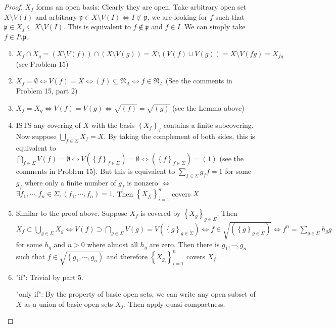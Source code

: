 \documentclass{solution}
\begin{document}
\begin{proof}
    $X_f$ forms an open basis: Clearly they are open. Take arbitrary open set $X \setminus V(I)$ and arbitrary $\mathfrak{p} \in X \setminus V(I) \Leftrightarrow I \not\subset \mathfrak{p}$, we are looking for $f$ such that $\mathfrak{p} \in X_f \subseteq X \setminus V(I)$. This is equivalent to $f \notin \mathfrak{p}$ and $f \in I$. We can simply take $f \in I \setminus \mathfrak{p}$.

    \begin{enumerate}
        \item $X_f \cap X_g = (X \setminus V(f)) \cap (X \setminus V(g)) = X \setminus (V(f) \cup V(g)) = X \setminus V(fg) = X_{fg}$ (see Problem 15)
        \item $X_f = \emptyset \Leftrightarrow V(f) = X \Leftrightarrow (f) \subseteq \mathfrak{N}_A \Leftrightarrow f \in \mathfrak{N}_A$ (See the comments in Problem 15, part 2)
        \item $X_f = X_g \Leftrightarrow V(f) = V(g) \Leftrightarrow \sqrt{(f)} = \sqrt{(g)}$ (see the Lemma above)
        \item ISTS any covering of $X$ with the basis $\left\lbrace X_f \right\rbrace_f$ contains a finite subcovering. Now suppose $\bigcup\limits_{f \in \Sigma} X_f = X$. By taking the complement of both sides, this is equivalent to $\bigcap\limits_{f \in \Sigma} V(f) = \emptyset \Leftrightarrow V(\left\lbrace f \right\rbrace_{f \in \Sigma}) = \emptyset \Leftrightarrow (\left\lbrace f \right\rbrace_{f \in \Sigma}) = (1)$ (see the comments in Problem 15). But this is equivalent to $\sum\limits_{f \in \Sigma} g_ff = 1$ for some $g_f$ where only a finite number of $g_f$ is nonzero $\Leftrightarrow$ $\exists f_1, \cdots, f_n \in \Sigma, (f_1, \cdots, f_n) = 1$. Then $\left\lbrace X_{f_i} \right\rbrace_{i = 1}^{n}$ covers $X$
        \item Similar to the proof above. Suppose $X_f$ is covered by $\left\lbrace X_g \right\rbrace_{g \in \Sigma}$. Then $X_f \subset \bigcup\limits_{g \in \Sigma} X_g \Leftrightarrow V(f) \supset \bigcap\limits_{g \in \Sigma} V(g) = V(\left\lbrace g \right\rbrace_{g \in \Sigma}) \Leftrightarrow f \in \sqrt{(\left\lbrace g \right\rbrace_{g \in \Sigma})} \Leftrightarrow f^n = \sum\limits_{g \in \Sigma}h_gg$ for some $h_g$ and $n \gt 0$ where almost all $h_g$ are zero. Then there is $g_1, \cdots, g_n$ such that $f \in \sqrt{(g_1, \cdots, g_n)}$ and therefore $\left\lbrace X_{g_i} \right\rbrace_{i = 1}^n$ covers $X_f$.
        \item "if": Trivial by part 5.

        "only if": By the property of basic open sets, we can write any open subset of $X$ as a union of basic open sets $X_f$. Then apply quasi-compactness.
    \end{enumerate}
\end{proof}
\end{document}
